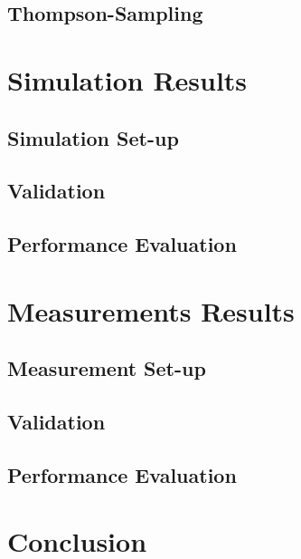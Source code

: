 \documentclass{sig-alternate}
\begin{document}
	\subsection{Thompson-Sampling}
	\label{s:minstrel-blues}


	\section{Simulation Results}
	\label{s:simulations}

	\subsection{Simulation Set-up}

	\subsection{Validation}

	\subsection{Performance Evaluation}


	\section{Measurements Results}
	\label{s:measurements}

	\subsection{Measurement Set-up}

	\subsection{Validation}

	\subsection{Performance Evaluation}


	\section{Conclusion}
	\label{s:conclusion}


	{
	
	\small
	
	}

\end{document}
